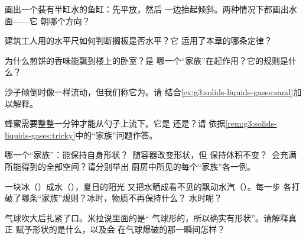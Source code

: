 \begin{exercise}[$\star$]\label{exo:g3:solids-liquids-gases:4}
画出一个装有半缸水的鱼缸：先平放，然后
一边抬起倾斜。两种情况下都画出水面——它
朝哪个方向？
\end{exercise}

\begin{exercise}[$\star$]\label{exo:g3:solids-liquids-gases:5}
建筑工人用的水平尺如何判断搁板是否水平？它
运用了本章的哪条定律？
\end{exercise}

\begin{exercise}[$\star$]\label{exo:g3:solids-liquids-gases:6}
为什么煎饼的香味能飘到楼上的卧室？是
哪一个“家族”在起作用？它的规则是什么？
\end{exercise}

\begin{exercise}[$\star$]\label{exo:g3:solids-liquids-gases:7}
沙子倾倒时像一样流动，但我们称它为。请
结合\cref{ex:g3:solids-liquids-gases:sand}加以解释。
\end{exercise}

\begin{exercise}[$\star$]\label{exo:g3:solids-liquids-gases:8}
蜂蜜需要整整一分钟才能从勺子上流下。它是
还是？请
依据\cref{rem:g3:solids-liquids-gases:tricky}中的“家族”问题作答。
\end{exercise}

\begin{exercise}[$\star$]\label{exo:g3:solids-liquids-gases:9}
哪一个“家族”：能保持自身形状？\ 随容器改变形状，但
保持体积不变？\ 会充满所能得到的全部空间？请分别举出
厨房中所见的每个“家族”各一例。
\end{exercise}

\begin{exercise}[$\star\star$]\label{exo:g3:solids-liquids-gases:10}
一块冰（）成水（），夏日的阳光
又把水晒成看不见的飘动水汽（）。每一步
各打破了哪条“家族”规则？冰时，物质不再保持什么？
水时呢？
\end{exercise}

\begin{exercise}[$\star\star$]\label{exo:g3:solids-liquids-gases:11}
气球吹大后扎紧了口。米拉说里面的是“
气球形的，所以确实有形状”。请解释真正
赋予形状的是什么，以及会
在气球爆破的那一瞬间怎样？
\end{exercise}
